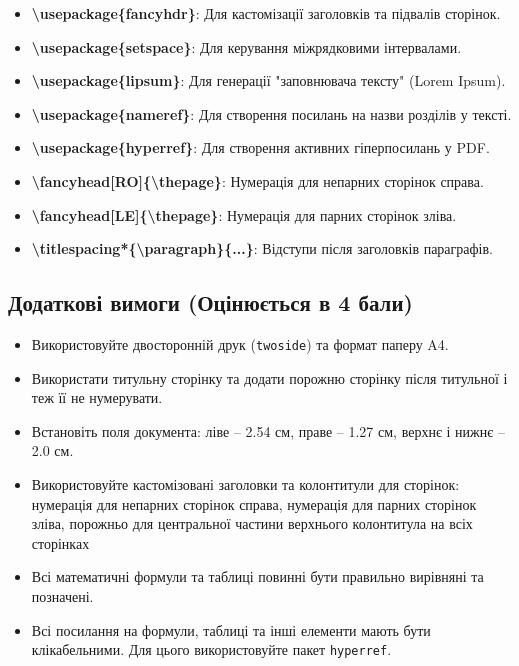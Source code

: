 \documentclass[14pt,a4paper,twoside]{article}
\begin{document}
\begin{itemize}
		\item \textbf{\textbackslash usepackage\{fancyhdr\}}: Для кастомізації заголовків та підвалів сторінок.
		
		\item \textbf{\textbackslash usepackage\{setspace\}}: Для керування міжрядковими інтервалами.
		
		\item \textbf{\textbackslash usepackage\{lipsum\}}: Для генерації "заповнювача тексту" (Lorem Ipsum).
		
		\item \textbf{\textbackslash usepackage\{nameref\}}: Для створення посилань на назви розділів у тексті.
		
		\item \textbf{\textbackslash usepackage\{hyperref\}}: Для створення активних гіперпосилань у PDF.
		
		\item \textbf{\textbackslash fancyhead[RO]\{\textbackslash thepage\}}: Нумерація для непарних сторінок справа.
		
		\item \textbf{\textbackslash fancyhead[LE]\{\textbackslash thepage\}}: Нумерація для парних сторінок зліва.
		
		\item \textbf{\textbackslash titlespacing*\{\textbackslash paragraph\}\{...\}}: Відступи після заголовків параграфів.
	\end{itemize}
	
	
	\subsection{Додаткові вимоги (Оцінюється в 4 бали)}
	\begin{itemize}
		\item Використовуйте двосторонній друк (\texttt{twoside}) та формат паперу A4.
		\item Використати титульну сторінку та додати порожню сторінку після титульної і теж її не нумерувати.
		\item Встановіть поля документа: ліве – 2.54 см, праве – 1.27 см, верхнє і нижнє – 2.0 см.
		\item Використовуйте кастомізовані заголовки та колонтитули для сторінок: нумерація для непарних сторінок справа, нумерація для парних сторінок зліва, порожньо для центральної частини верхнього колонтитула на всіх сторінках
		\item Всі математичні формули та таблиці повинні бути правильно вирівняні та позначені.
		\item Всі посилання на формули, таблиці та інші елементи мають бути клікабельними. Для цього використовуйте пакет \texttt{hyperref}.
	\end{itemize}
	
\end{document}
